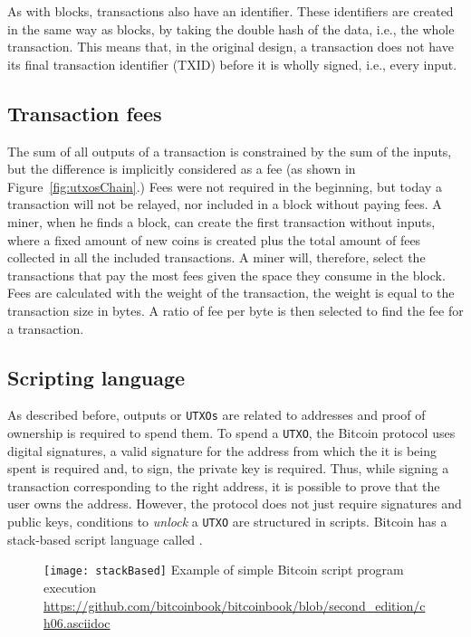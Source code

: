 As with blocks, transactions also have an identifier. These identifiers are created in the
same way as blocks, by taking the double hash of the data, i.e., the whole
transaction. This means that, in the original design, a transaction does not
have its final transaction identifier (TXID) before it is wholly signed, i.e., every
input.

\subsection{Transaction fees}

The sum of all outputs of a transaction is constrained by the sum of the
inputs, but the difference is implicitly considered as a fee (as
shown in Figure~\ref{fig:utxosChain}.) Fees were not required in the beginning, but
today a transaction will not be relayed, nor included in a block without paying fees. A
miner, when he finds a block, can create the first transaction without inputs,
where a fixed amount of new coins is created plus the total amount of fees
collected in all the included transactions. A miner will, therefore, select the
transactions that pay the most fees given the space they consume in the block.
Fees are calculated with the weight of the transaction, the weight is equal to
the transaction size in bytes. A ratio of fee per byte is then selected
to find the fee for a transaction.

\subsection{Scripting language}

As described before, outputs or \texttt{UTXOs} are related to addresses and
proof of ownership is required to spend them. To spend a \texttt{UTXO}, the
Bitcoin protocol uses digital signatures, a valid
signature for the address from which the it is being spent is required and,
to sign, the private key is required. Thus, while signing a transaction
corresponding to the right address, it is possible to prove that the user owns
the address. However, the protocol does not just require signatures and public
keys, conditions to \textit{unlock} a \texttt{UTXO} are structured in scripts.
Bitcoin has a stack-based script language called .

\begin{figure}[H]
	\centering
	\texttt{[image: stackBased]}
  {Example of simple Bitcoin script program execution}
	{\url{https://github.com/bitcoinbook/bitcoinbook/blob/second_edition/ch06.asciidoc}}
	\label{fig:stackBased}
\end{figure}

